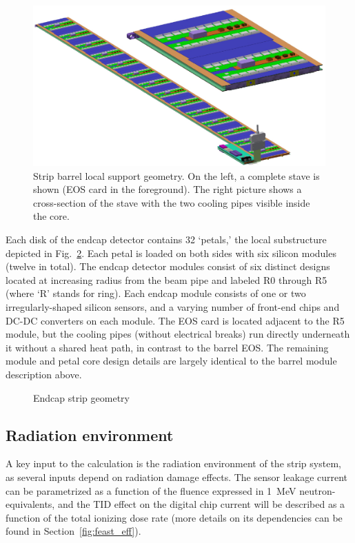 \begin{figure}[ht]
\centering
\includegraphics[width=0.8\linewidth]{figures/stave.pdf}
\caption{Strip barrel local support geometry. On the left, a complete stave is shown (EOS card in the foreground). The right picture shows a cross-section of the stave with the two cooling pipes visible inside the core. }
\label{fig:barrelgeometry}
\end{figure}

Each disk of the endcap detector contains 32 `petals,' the local substructure depicted in Fig.~\ref{fig:endcapgeometry}.
Each petal is loaded on both sides with six silicon modules (twelve in total).
The endcap detector modules consist of six distinct designs located at increasing radius from the
beam pipe and labeled R0 through R5 (where `R' stands for ring). Each endcap module consists of one
or two irregularly-shaped silicon sensors, and a varying number of front-end chips and DC-DC converters on each module.
The EOS card is located adjacent to the R5 module, but the
cooling pipes (without electrical breaks) run directly underneath it without a shared heat path, in contrast to the barrel EOS.
The remaining module and petal core design details are largely identical to the barrel module description above.

\begin{figure}[ht]
\centering
\caption{Endcap strip geometry}
\label{fig:endcapgeometry}
\end{figure}

\subsection{Radiation environment}
A key input to the calculation is the radiation environment of the strip system, as several inputs depend on radiation damage effects. The sensor leakage current can be parametrized as  a function of the fluence expressed in 1~MeV neutron-equivalents, and the TID effect on the digital chip current will be described as a function of the total ionizing dose rate (more details on its dependencies can be found in Section~\ref{fig:feast_eff}). 

